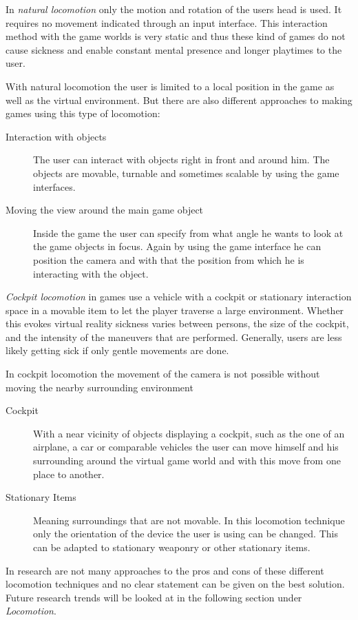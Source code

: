 In \textit{natural locomotion} only the motion and rotation of the users head is used. It requires no movement indicated through an input interface. This interaction method with the game worlds is very static and thus these kind of games do not cause sickness and enable constant mental presence and longer playtimes to the user.

With natural locomotion the user is limited to a local position in the game as well as the virtual environment. But there are also different approaches to making games using this type of locomotion:
\begin{description}
	\item[Interaction with objects]The user can interact with objects right in 
	front and around him. The objects are movable, turnable and sometimes 
	scalable by using the game interfaces.
	\item[Moving the view around the main game object]Inside the game the user can 
	specify from what angle he wants to look at the game objects in focus. 
	Again by using the game interface he can position the camera and with that 
	the position from which he is interacting with the object.
\end{description}

\textit{Cockpit locomotion} in games use a vehicle with a cockpit or stationary interaction space in a movable item to let the player traverse a large environment. Whether this evokes virtual reality sickness varies between persons, the size of the cockpit, and the intensity of the maneuvers that are performed. Generally, users are less likely getting sick if only gentle movements are done.

In cockpit locomotion the movement of the camera is not possible without moving 
the nearby surrounding environment
\begin{description}
	\item[Cockpit]With a near vicinity of objects displaying a cockpit, such as 
	the one of an airplane, a car or comparable vehicles the user can move 
	himself and his surrounding around the virtual game world and with this 
	move from one place to another.
	\item[Stationary Items]Meaning surroundings that are not movable. In this 
	locomotion technique only the orientation of the device the user is using 
	can be changed. This can be adapted to stationary weaponry or other 
	stationary items.
\end{description}

In research are not many approaches to the pros and cons of these different locomotion 
techniques and no clear statement can be given on the best solution. 
Future research trends will be looked at in the following section under 
\textit{Locomotion}.
